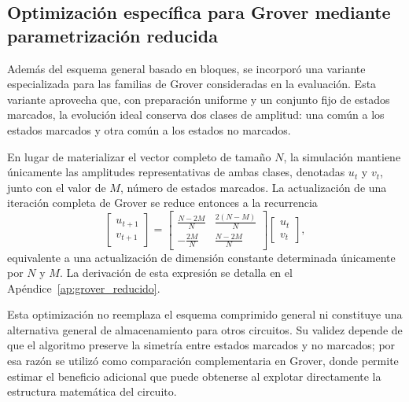 \subsection{Optimización específica para Grover mediante parametrización reducida}
\label{subsec:grover_reducido_impl}

Además del esquema general basado en bloques, se incorporó una variante especializada para las
familias de Grover consideradas en la evaluación. Esta variante aprovecha que, con
preparación uniforme y un conjunto fijo de estados marcados, la evolución ideal conserva dos
clases de amplitud: una común a los estados marcados y otra común a los estados no marcados.

En lugar de materializar el vector completo de tamaño $N$, la simulación mantiene únicamente
las amplitudes representativas de ambas clases, denotadas $u_t$ y $v_t$, junto con el valor
de $M$, número de estados marcados. La actualización de una iteración completa de Grover se
reduce entonces a la recurrencia
\[
\begin{bmatrix}
u_{t+1} \\
v_{t+1}
\end{bmatrix}
=
\begin{bmatrix}
\frac{N-2M}{N} & \frac{2(N-M)}{N} \\
-\frac{2M}{N} & \frac{N-2M}{N}
\end{bmatrix}
\begin{bmatrix}
u_t \\
v_t
\end{bmatrix},
\]
equivalente a una actualización de dimensión constante determinada únicamente por $N$ y $M$.
La derivación de esta expresión se detalla en el Apéndice~\ref{ap:grover_reducido}.

Esta optimización no reemplaza el esquema comprimido general ni constituye una alternativa general de
almacenamiento para otros circuitos. Su validez depende de que el algoritmo preserve la
simetría entre estados marcados y no marcados; por esa razón se utilizó como comparación
complementaria en Grover, donde permite estimar el beneficio adicional que puede obtenerse al
explotar directamente la estructura matemática del circuito.
